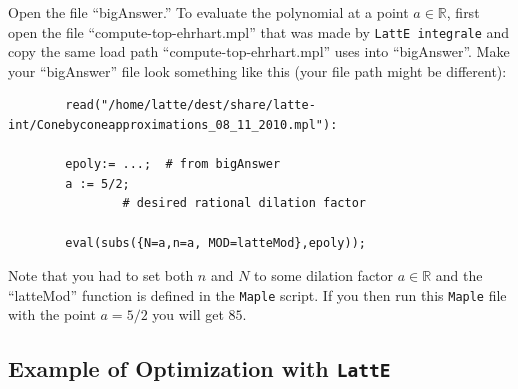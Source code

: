 \documentclass{article}
\newcommand{\R}{{\mathbb R}}
\newcommand{\latte}{{\tt LattE}\xspace}
\newcommand{\latteInt}{{\tt LattE integrale}\xspace}
\newcommand{\maple}{{\tt Maple}\xspace}
\begin{document}
Open the file ``bigAnswer.'' To evaluate the polynomial at a point $a \in \R$, first open the file ``compute-top-ehrhart.mpl'' that was made by \latteInt and copy the same load path ``compute-top-ehrhart.mpl'' uses into ``bigAnswer''. Make your ``bigAnswer'' file look something like this (your file path might be different):

        \begin{verbatim}
        read("/home/latte/dest/share/latte-int/Conebyconeapproximations_08_11_2010.mpl"):
        
        epoly:= ...;  # from bigAnswer
        a := 5/2;
                # desired rational dilation factor
        
        eval(subs({N=a,n=a, MOD=latteMod},epoly));
        \end{verbatim}
Note that you had to set both $n$ and $N$ to some dilation factor $a \in \R$ and the ``latteMod'' function is defined in the \maple script. If you then run this \maple file with the point $a=5/2$ you will get $85$.

\subsection{Example of Optimization with \latte}
\end{document}
